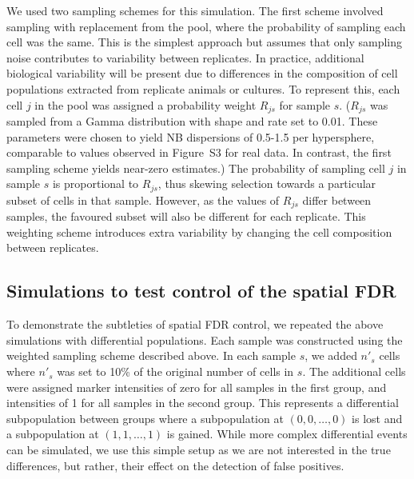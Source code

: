 \documentclass{article}
\newcommand{\suppfignbdisp}{S3}
\begin{document}
We used two sampling schemes for this simulation.
The first scheme involved sampling with replacement from the pool, where the probability of sampling each cell was the same.
This is the simplest approach but assumes that only sampling noise contributes to variability between replicates.
In practice, additional biological variability will be present due to differences in the composition of cell populations extracted from replicate animals or cultures.
To represent this, each cell $j$ in the pool was assigned a probability weight $R_{js}$ for sample $s$.
($R_{js}$ was sampled from a Gamma distribution with shape and rate set to 0.01.
These parameters were chosen to yield NB dispersions of 0.5-1.5 per hypersphere, comparable to values observed in Figure~\suppfignbdisp{} for real data.
In contrast, the first sampling scheme yields near-zero estimates.)
The probability of sampling cell $j$ in sample $s$ is proportional to $R_{js}$, thus skewing selection towards a particular subset of cells in that sample.
However, as the values of $R_{js}$ differ between samples, the favoured subset will also be different for each replicate.
This weighting scheme introduces extra variability by changing the cell composition between replicates.

\subsection{Simulations to test control of the spatial FDR}
To demonstrate the subtleties of spatial FDR control, we repeated the above simulations with differential populations.
Each sample was constructed using the weighted sampling scheme described above.
In each sample $s$, we added $n'_s$ cells where $n'_s$ was set to 10\% of the original number of cells in $s$.
The additional cells were assigned marker intensities of zero for all samples in the first group, and intensities of 1 for all samples in the second group.
This represents a differential subpopulation between groups where a subpopulation at $(0,0, \ldots, 0)$ is lost and a subpopulation at $(1, 1, \ldots, 1)$ is gained.
While more complex differential events can be simulated, we use this simple setup as we are not interested in the true differences, but rather, their effect on the detection of false positives.
\end{document}
